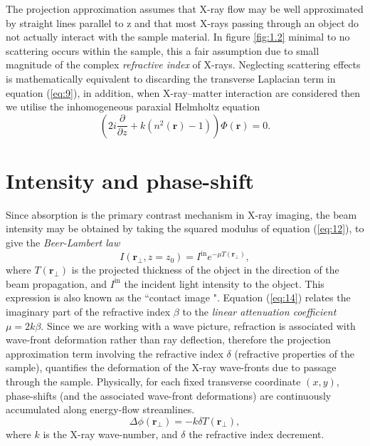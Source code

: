 \documentclass[10pt, a4paper, singlespacing]{report}
\begin{document}
The projection approximation assumes that X-ray flow may be well approximated by straight lines parallel to z\cite{PagsTutes} and that most X-rays passing through an object do not actually interact with the sample material. In figure \ref{fig:1.2} minimal to no scattering occurs within the sample, this a fair assumption due to small magnitude of the complex \textit{refractive index} of X-rays. Neglecting scattering effects is mathematically equivalent to discarding the transverse Laplacian term in equation (\ref{eq:9})\cite{CH49}, in addition, when X-ray--matter interaction are considered then we utilise the inhomogeneous paraxial Helmholtz equation
\begin{equation}\label{eq:13}
\left ( 2 i \frac{\partial }{\partial z} + k ( n^2 (\mathbf{r}) - 1 )\right ) \Phi(\mathbf{r}) = 0.
\end{equation}

\section{Intensity and phase-shift}\label{intensity and phase}

Since absorption is the primary contrast mechanism in X-ray imaging, the beam intensity may be obtained by taking the squared modulus of equation (\ref{eq:12}), to give the \textit{Beer-Lambert law}\cite{PagsTutes}
\begin{equation}\label{eq:14}
I(\mathbf{r}_{\perp}, z = z_0) = I^{\mathrm{in}} e^{-\mu T(\mathbf{r}_{\perp})},
\end{equation}
where $T(\mathbf{r}_{\perp})$ is the projected thickness of the object in the direction of the beam propagation, and $I^{\mathrm{in}}$ the incident light intensity to the object. This expression is also known as the ``contact image ". Equation (\ref{eq:14}) relates the imaginary part of the refractive index $\beta$ to the \textit{linear attenuation coefficient} $\mu = 2k\beta$. 
Since we are working with a wave picture, refraction is associated with wave-front deformation rather than ray deflection, therefore the projection approximation term involving the refractive index $\delta$ (refractive properties of the sample), quantifies the deformation of the X-ray wave-fronts due to passage through the sample. Physically, for each fixed transverse coordinate $(x, y)$, phase-shifts (and the associated wave-front deformations) are continuously accumulated along energy-flow streamlines\cite{PagsTutes}.
\begin{equation}\label{eq:15}
\Delta \phi(\mathbf{r}_{\perp}) = -k \delta T(\mathbf{r}_{\perp}),
\end{equation}
where $k$ is the X-ray wave-number, and $\delta$ the refractive index decrement.
\end{document}
